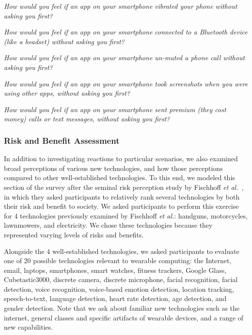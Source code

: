 \documentclass{acm_proc_article-sp}
\def\etal{{\it et al.~}}
\newenvironment{packed_enum}{
\begin{enumerate}
  \setlength{\itemsep}{1pt}
  \setlength{\parskip}{0pt}
  \setlength{\parsep}{0pt}
}{\end{enumerate}}
\begin{document}
\begin{packed_enum}
\item \textit{How would you feel if an app on your smartphone vibrated your phone without asking you first?}
\item \textit{How would you feel if an app on your smartphone connected to a Bluetooth device (like a headset) without asking you first?}
\item \textit{How would you feel if an app on your smartphone un-muted a phone call without asking you first?}
\item \textit{How would you feel if an app on your smartphone took screenshots when you were using other apps, without asking you first?}
\item \textit{How would you feel if an app on your smartphone sent premium (they cost money) calls or text messages, without asking you first?} 
\end{packed_enum}

\subsubsection{Risk and Benefit Assessment}
In addition to investigating reactions to particular scenarios, we also examined broad perceptions of various new technologies, and how those perceptions compared to other well-established technologies. To this end, we modeled this section of the survey after the seminal risk perception study by Fischhoff \etal\cite{Fischhoff}, in which they asked participants to relatively rank several technologies by both their risk and benefit to society. We asked participants to perform this exercise for 4 technologies previously examined by Fischhoff {\it et al.}: handguns, motorcycles, lawnmowers, and electricity. We chose these technologies because they represented varying levels of risks and benefits.

Alongside the 4 well-established technologies, we asked participants to evaluate one of 20 possible technologies relevant to wearable computing: the Internet, email, laptops, smartphones, smart watches, fitness trackers, Google Glass, Cubetastic3000, discrete camera, discrete microphone, facial recognition, facial detection, voice recognition, voice-based emotion detection, location tracking, speech-to-text, language detection, heart rate detection, age detection, and gender detection. Note that we ask about familiar new technologies such as the internet, general classes and specific artifacts of wearable devices, and a range of new capabilities. 
\end{document}
